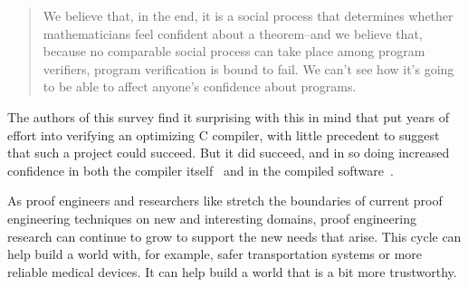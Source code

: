 \begin{quote}
We believe that, in the end, it is a social process that determines whether mathematicians feel confident about a theorem--and we believe that, because no comparable social process can take place among program verifiers, program verification is bound to fail. We can't see how it's going to be able to affect anyone's confidence about programs.
\end{quote}
The authors of this survey find it surprising with this in mind that \cite{Leroy:POPL06, Leroy2009} put years of effort into verifying
an optimizing C compiler, with little precedent to suggest that such a project could succeed.
But it did succeed, and in so doing increased confidence in both the compiler itself~\citep{Yang2011}
and in the compiled software~\citep{CompCert-ERTS-2018}.

As proof engineers and researchers like \cite{Leroy:POPL06} stretch the boundaries of current proof engineering
techniques on new and interesting domains, proof engineering research can continue to grow to support
the new needs that arise. This cycle can help build a world with, for example, safer transportation systems or more reliable medical devices.
It can help build a world that is a bit more trustworthy.

